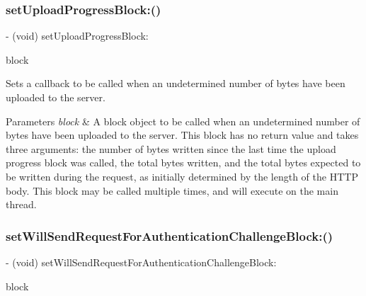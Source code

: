 \subsubsection{\texorpdfstring{set\+Upload\+Progress\+Block\+:()}{setUploadProgressBlock:()}\hspace{0.1cm}{\footnotesize\ttfamily [3/3]}}
{\footnotesize\ttfamily -\/ (void) set\+Upload\+Progress\+Block\+: \begin{DoxyParamCaption}\item[{(nullable void($^\wedge$)(N\+S\+U\+Integer bytes\+Written, long long total\+Bytes\+Written, long long total\+Bytes\+Expected\+To\+Write))}]{block }\end{DoxyParamCaption}}

Sets a callback to be called when an undetermined number of bytes have been uploaded to the server.


\begin{DoxyParams}{Parameters}
{\em block} & A block object to be called when an undetermined number of bytes have been uploaded to the server. This block has no return value and takes three arguments\+: the number of bytes written since the last time the upload progress block was called, the total bytes written, and the total bytes expected to be written during the request, as initially determined by the length of the H\+T\+TP body. This block may be called multiple times, and will execute on the main thread. \\
\hline
\end{DoxyParams}
\mbox{\label{interface_a_f_u_r_l_connection_operation_a1b3cba1bf8db5763863c288ed04e4f31}} 
\subsubsection{\texorpdfstring{set\+Will\+Send\+Request\+For\+Authentication\+Challenge\+Block\+:()}{setWillSendRequestForAuthenticationChallengeBlock:()}\hspace{0.1cm}{\footnotesize\ttfamily [1/3]}}
{\footnotesize\ttfamily -\/ (void) set\+Will\+Send\+Request\+For\+Authentication\+Challenge\+Block\+: \begin{DoxyParamCaption}\item[{(nullable void($^\wedge$)(N\+S\+U\+R\+L\+Connection $\ast$connection, N\+S\+U\+R\+L\+Authentication\+Challenge $\ast$challenge))}]{block }\end{DoxyParamCaption}}

